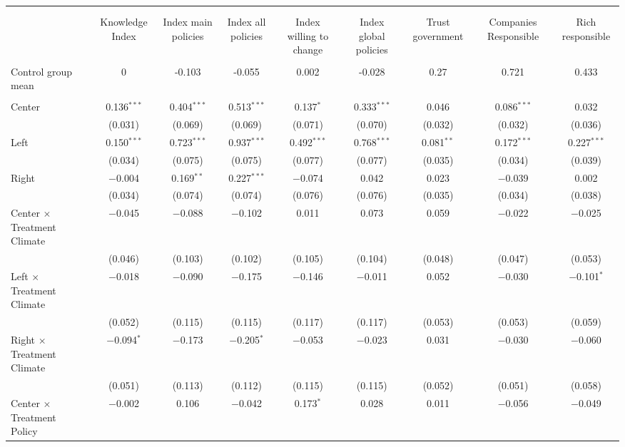 
\begin{tabular}{@{\extracolsep{5pt}}lcccccccc} 
\\[-1.8ex]\hline 
\hline \\[-1.8ex] 
\\[-1.8ex] & Knowledge Index & Index main policies & Index all policies & Index willing to change & Index global policies & Trust government & Companies Responsible & Rich responsible \\ 
\hline \\[-1.8ex] 
 Control group mean & 0 & -0.103 & -0.055 & 0.002 & -0.028 & 0.27 & 0.721 & 0.433  \\ \hline \\[-1.8ex] Center & 0.136$^{***}$ & 0.404$^{***}$ & 0.513$^{***}$ & 0.137$^{*}$ & 0.333$^{***}$ & 0.046 & 0.086$^{***}$ & 0.032 \\ 
  & (0.031) & (0.069) & (0.069) & (0.071) & (0.070) & (0.032) & (0.032) & (0.036) \\ 
 Left & 0.150$^{***}$ & 0.723$^{***}$ & 0.937$^{***}$ & 0.492$^{***}$ & 0.768$^{***}$ & 0.081$^{**}$ & 0.172$^{***}$ & 0.227$^{***}$ \\ 
  & (0.034) & (0.075) & (0.075) & (0.077) & (0.077) & (0.035) & (0.034) & (0.039) \\ 
 Right & $-$0.004 & 0.169$^{**}$ & 0.227$^{***}$ & $-$0.074 & 0.042 & 0.023 & $-$0.039 & 0.002 \\ 
  & (0.034) & (0.074) & (0.074) & (0.076) & (0.076) & (0.035) & (0.034) & (0.038) \\ 
 Center $\times$ Treatment Climate & $-$0.045 & $-$0.088 & $-$0.102 & 0.011 & 0.073 & 0.059 & $-$0.022 & $-$0.025 \\ 
  & (0.046) & (0.103) & (0.102) & (0.105) & (0.104) & (0.048) & (0.047) & (0.053) \\ 
 Left $\times$ Treatment Climate & $-$0.018 & $-$0.090 & $-$0.175 & $-$0.146 & $-$0.011 & 0.052 & $-$0.030 & $-$0.101$^{*}$ \\ 
  & (0.052) & (0.115) & (0.115) & (0.117) & (0.117) & (0.053) & (0.053) & (0.059) \\ 
 Right $\times$ Treatment Climate & $-$0.094$^{*}$ & $-$0.173 & $-$0.205$^{*}$ & $-$0.053 & $-$0.023 & 0.031 & $-$0.030 & $-$0.060 \\ 
  & (0.051) & (0.113) & (0.112) & (0.115) & (0.115) & (0.052) & (0.051) & (0.058) \\ 
 Center $\times$ Treatment Policy & $-$0.002 & 0.106 & $-$0.042 & 0.173$^{*}$ & 0.028 & 0.011 & $-$0.056 & $-$0.049 \\ 

\end{tabular}
